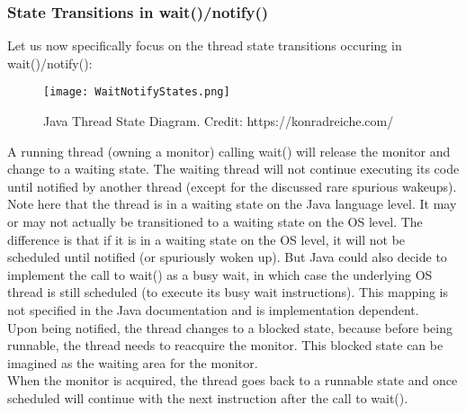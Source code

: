 \documentclass[main.tex]{subfiles}
\begin{document}
\subsubsection{State Transitions in wait()/notify()}
Let us now specifically focus on the thread state transitions occuring in wait()/notify():
\begin{figure}[H]
    \centering
    \texttt{[image: WaitNotifyStates.png]}
    \caption{Java Thread State Diagram. Credit: https://konradreiche.com/}
\end{figure}
A running thread (owning a monitor) calling wait() will release the monitor and change to a waiting state. The waiting thread will not continue executing its code until notified by another thread (except for the discussed rare spurious wakeups). Note here that the thread is in a waiting state on the Java language level. It may or may not actually be transitioned to a waiting state on the OS level. The difference is that if it is in a waiting state on the OS level, it will not be scheduled until notified (or spuriously woken up). But Java could also decide to implement the call to wait() as a busy wait, in which case the underlying OS thread is still scheduled (to execute its busy wait instructions). This mapping is not specified in the Java documentation and is implementation dependent.\\
Upon being notified, the thread changes to a blocked state, because before being runnable, the thread needs to reacquire the monitor. This blocked state can be imagined as the waiting area for the monitor.\\
When the monitor is acquired, the thread goes back to a runnable state and once scheduled will continue with the next instruction after the call to wait().
\end{document}
